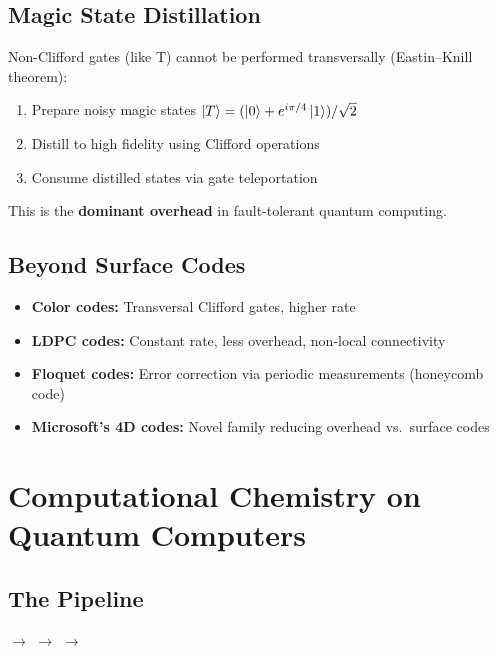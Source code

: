 \documentclass[11pt,a4paper]{article}
\begin{document}
\subsection{Magic State Distillation}

Non-Clifford gates (like T) cannot be performed transversally (Eastin--Knill theorem):
\begin{enumerate}
    \item Prepare noisy magic states $\ket{T} = (\ket{0} + e^{i\pi/4}\ket{1})/\sqrt{2}$
    \item Distill to high fidelity using Clifford operations
    \item Consume distilled states via gate teleportation
\end{enumerate}
This is the \textbf{dominant overhead} in fault-tolerant quantum computing.

\subsection{Beyond Surface Codes}
\begin{itemize}
    \item \textbf{Color codes:} Transversal Clifford gates, higher rate
    \item \textbf{LDPC codes:} Constant rate, less overhead, non-local connectivity
    \item \textbf{Floquet codes:} Error correction via periodic measurements (honeycomb code)
    \item \textbf{Microsoft's 4D codes:} Novel family reducing overhead vs.\ surface codes
\end{itemize}


\section{Computational Chemistry on Quantum Computers}

\subsection{The Pipeline}

\begin{center}
 $\to$  $\to$  $\to$ 
\end{center}
\end{document}
